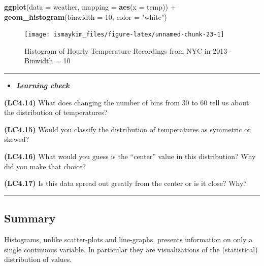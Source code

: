 \documentclass[]{tufte-book}
\newenvironment{Shaded}{\begin{snugshade}}{\end{snugshade}}
\newcommand{\KeywordTok}[1]{\textcolor[rgb]{0.13,0.29,0.53}{\textbf{{#1}}}}
\newcommand{\DataTypeTok}[1]{\textcolor[rgb]{0.13,0.29,0.53}{{#1}}}
\newcommand{\DecValTok}[1]{\textcolor[rgb]{0.00,0.00,0.81}{{#1}}}
\newcommand{\StringTok}[1]{\textcolor[rgb]{0.31,0.60,0.02}{{#1}}}
\newcommand{\NormalTok}[1]{{#1}}
\let\oldrule=\rule
\renewcommand{\rule}[1]{\oldrule{\linewidth}}
\newenvironment{rmdblock}[1]
  {\begin{shaded*}
  \begin{itemize}
  \renewcommand{\labelitemi}{
    \raisebox{-.7\height}[0pt][0pt]{
    }
  }
  \item
  }
  {
  \end{itemize}
  \end{shaded*}
  }
\newenvironment{learncheck}
  {\begin{rmdblock}{warning}}
  {\end{rmdblock}}
\begin{document}
\begin{Shaded}
\begin{Highlighting}[]
\KeywordTok{ggplot}\NormalTok{(}\DataTypeTok{data =} \NormalTok{weather, }\DataTypeTok{mapping =} \KeywordTok{aes}\NormalTok{(}\DataTypeTok{x =} \NormalTok{temp)) +}
\StringTok{  }\KeywordTok{geom_histogram}\NormalTok{(}\DataTypeTok{binwidth =} \DecValTok{10}\NormalTok{, }\DataTypeTok{color =} \StringTok{"white"}\NormalTok{)}
\end{Highlighting}
\end{Shaded}

\begin{figure}

{\centering \texttt{[image: ismaykim\_files/figure-latex/unnamed-chunk-23-1]} 

}

\caption[Histogram of Hourly Temperature Recordings from NYC in 2013 - Binwidth = 10]{Histogram of Hourly Temperature Recordings from NYC in 2013 - Binwidth = 10}\label{fig:unnamed-chunk-23}
\end{figure}

\begin{center}\rule{0.5\linewidth}{\linethickness}\end{center}

\begin{learncheck}
\textbf{\emph{Learning check}}
\end{learncheck}

\textbf{(LC4.14)} What does changing the number of bins from 30 to 60
tell us about the distribution of temperatures?

\textbf{(LC4.15)} Would you classify the distribution of temperatures as
symmetric or skewed?

\textbf{(LC4.16)} What would you guess is the ``center'' value in this
distribution? Why did you make that choice?

\textbf{(LC4.17)} Is this data spread out greatly from the center or is
it close? Why?

\begin{center}\rule{0.5\linewidth}{\linethickness}\end{center}

\subsection{Summary}\label{summary-2}

Histograms, unlike scatter-plots and line-graphs, presents information
on only a single continuous variable. In particular they are
visualizations of the (statistical) distribution of values.
\end{document}
